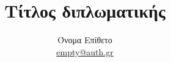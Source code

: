 \documentclass[a4paper,12pt]{report}
\def\tl{\textlatin}
\begin{document}


\title{Τίτλος διπλωματικής}
\author{Όνομα Επίθετο \\
\href{mailto:empty@auth.gr}{\tl{empty@auth.gr}}}
\maketitle

\tableofcontents
\thispagestyle{empty}
\clearpage
{}



\appendix






\end{document}
